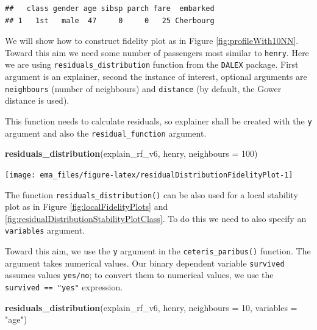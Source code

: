 \documentclass[12pt,]{krantz}
\newenvironment{Shaded}{\begin{snugshade}}{\end{snugshade}}
\newcommand{\DataTypeTok}[1]{\textcolor[rgb]{0.13,0.29,0.53}{#1}}
\newcommand{\DecValTok}[1]{\textcolor[rgb]{0.00,0.00,0.81}{#1}}
\newcommand{\KeywordTok}[1]{\textcolor[rgb]{0.13,0.29,0.53}{\textbf{#1}}}
\newcommand{\NormalTok}[1]{#1}
\newcommand{\StringTok}[1]{\textcolor[rgb]{0.31,0.60,0.02}{#1}}
\begin{document}
\begin{verbatim}
##   class gender age sibsp parch fare  embarked
## 1   1st   male  47     0     0   25 Cherbourg
\end{verbatim}

We will show how to construct fidelity plot as in Figure \ref{fig:profileWith10NN}. Toward this aim we need some number of passengers most similar to \texttt{henry}.
Here we are using \texttt{residuals\_distribution} function from the \texttt{DALEX} package. First argument is an explainer, second the instance of interest, optional arguments are \texttt{neighbours} (number of neighbours) and \texttt{distance} (by default, the Gower distance is used).

This function needs to calculate residuals, so explainer shall be created with the \texttt{y} argument and also the \texttt{residual\_function} argument.

\begin{Shaded}
\begin{Highlighting}[]
\KeywordTok{residuals_distribution}\NormalTok{(explain_rf_v6,}
\NormalTok{                          henry,}
                          \DataTypeTok{neighbours =} \DecValTok{100}\NormalTok{)}
\end{Highlighting}
\end{Shaded}

\begin{center}\texttt{[image: ema\_files/figure-latex/residualDistributionFidelityPlot-1]} \end{center}

The function \texttt{residuals\_distribution()} can be also used for a local stability plot as in Figure \ref{fig:localFidelityPlots} and \ref{fig:residualDistributionStabilityPlotClass}. To do this we need to also specify an \texttt{variables} argument.

Toward this aim, we use the \texttt{y} argument in the \texttt{ceteris\_paribus()} function. The argument takes numerical values. Our binary dependent variable \texttt{survived} assumes values \texttt{yes/no}; to convert them to numerical values, we use the \texttt{survived\ ==\ "yes"} expression.

\begin{Shaded}
\begin{Highlighting}[]
\KeywordTok{residuals_distribution}\NormalTok{(explain_rf_v6,}
\NormalTok{                          henry, }
                       \DataTypeTok{neighbours =} \DecValTok{10}\NormalTok{,}
                       \DataTypeTok{variables =} \StringTok{"age"}\NormalTok{)}
\end{Highlighting}
\end{Shaded}
\end{document}

